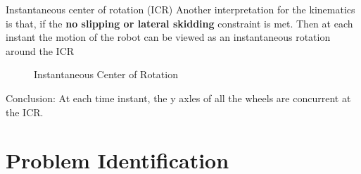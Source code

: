 \documentclass[10pt]{beamer}
\begin{document}
\begin{frame}{Instantaneous center of rotation (ICR)}
    Another interpretation for the kinematics is that, if the \textbf{no slipping or lateral skidding} constraint is met. Then at each instant the motion of the robot can be viewed as an instantaneous rotation around the ICR
    \begin{figure}
	\begin{center}
	\resizebox{4cm}{!}
    {
		}
	\end{center}
	\caption{Instantaneous Center of Rotation}
\end{figure}
Conclusion: At each time instant, the y axles of all the wheels are concurrent at the ICR.
\end{frame}

\section{Problem Identification}
\end{document}
